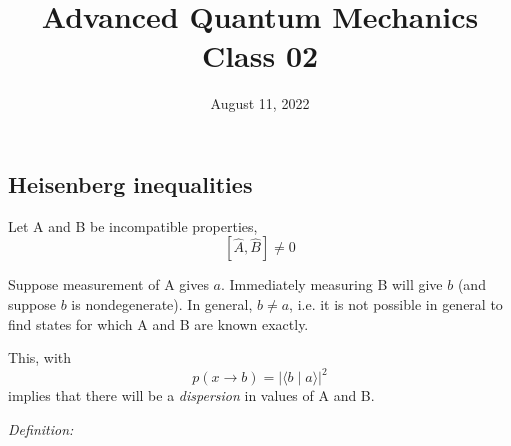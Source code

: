 \documentclass[12pt]{article}
\title{Advanced Quantum Mechanics\\Class 02}
\date{August 11, 2022}                                           %
\begin{document}
\maketitle

\setcounter{section}{3}
\setcounter{equation}{16}


\subsection{Heisenberg inequalities}

Let A and B be incompatible properties,
\[
[\hat{A}, \hat{B}] \neq 0
\]

Suppose measurement of A gives $a$. Immediately
measuring B will give $b$ (and suppose $b$ is nondegenerate). 
In general, $b \neq a$, i.e.
it is not possible in general to find states for which A and B are known exactly. 


This, with
\[
p(x \rightarrow b)=|\langle b \mid a\rangle|^{2}
\]
implies that there will be a \emph{dispersion} in values of A and B.

\emph{Definition:}
\end{document}
